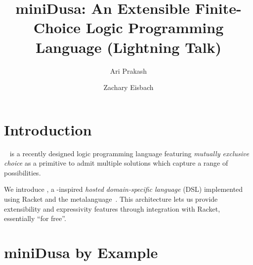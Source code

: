 \documentclass[dvipsnames,sigplan,screen,acmthm,nonacm]{acmart}
\begin{document}
\title{miniDusa: An Extensible Finite-Choice Logic Programming Language (Lightning Talk)}



\author{Ari Prakash}


\author{Zachary Eisbach}
\authornotemark[1]


\maketitle

\section{Introduction}

\Dusa{}~\cite{martens2025dusa} %
is a recently designed logic programming language featuring
\emph{mutually exclusive choice} as a primitive 
to admit multiple solutions which
capture a range of possibilities.

We introduce \miniDusa{}, a \Dusa{}-inspired
\emph{hosted domain-specific language} (DSL) implemented using Racket and
the \syntaxspec{} metalanguage~\cite{ballantyne2024pearl}. %
This architecture lets us provide extensibility and expressivity features
through integration with Racket, essentially ``for free''.

\section{miniDusa by Example}
\end{document}
